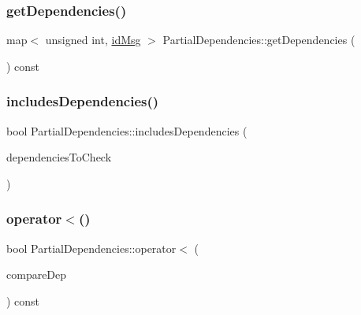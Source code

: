 \mbox{\label{class_partial_dependencies_a816f0a770b1d6f3255a1485705e262d2}} 
\subsubsection{\texorpdfstring{get\+Dependencies()}{getDependencies()}}
{\footnotesize\ttfamily map$<$ unsigned int, \hyperlink{structures_8h_a83a1d9a070efa5341da84cfd8e28d3e5}{id\+Msg} $>$ Partial\+Dependencies\+::get\+Dependencies (\begin{DoxyParamCaption}{ }\end{DoxyParamCaption}) const}

\mbox{\label{class_partial_dependencies_a4cfd27959669b5b7b58ea07d38824d7b}} 
\subsubsection{\texorpdfstring{includes\+Dependencies()}{includesDependencies()}}
{\footnotesize\ttfamily bool Partial\+Dependencies\+::includes\+Dependencies (\begin{DoxyParamCaption}\item[{const \hyperlink{class_partial_dependencies}{Partial\+Dependencies} \&}]{dependencies\+To\+Check }\end{DoxyParamCaption})}

\mbox{\label{class_partial_dependencies_af8f87bc4a622db0f56276502c6655f38}} 
\subsubsection{\texorpdfstring{operator$<$()}{operator<()}}
{\footnotesize\ttfamily bool Partial\+Dependencies\+::operator$<$ (\begin{DoxyParamCaption}\item[{const \hyperlink{class_partial_dependencies}{Partial\+Dependencies} \&}]{compare\+Dep }\end{DoxyParamCaption}) const}

